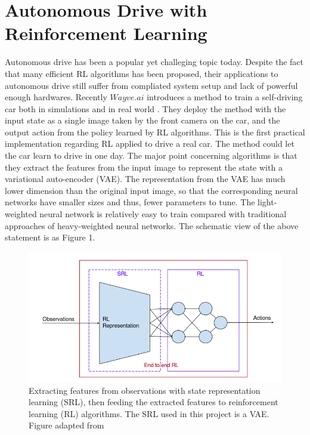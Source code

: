 \documentclass{article} %
\begin{document}
\section{Autonomous Drive with Reinforcement Learning}
Autonomous drive has been a popular yet challeging topic today. Despite the fact that many efficient RL algorithms has been proposed, their applications to autonomous drive still suffer from compliated system setup and lack of powerful enough hardwares. Recently $Wayve.ai$ introduces a method to train a self-driving car both in simulations and in real world \cite{kendall2018learning}. They deploy the method with the input state as a single image taken by the front camera on the car, and the output action from the policy learned by RL algorithms. This is the first practical implementation regarding RL applied to drive a real car. The method could let the car learn to drive in one day. The major point concerning algorithms is that they extract the features from the input image to represent the state with a variational auto-encoder (VAE). The representation from the VAE has much lower dimension than the original input image, so that the corresponding neural networks have smaller sizes and thus, fewer parameters to tune. The light-weighted neural network is relatively easy to train compared with traditional approaches of heavy-weighted neural networks. The schematic view of the above statement is as Figure 1.

\begin{figure}[!htb]
  \centering
  \includegraphics[width=0.7\linewidth]{fig1_srl.png}
  \caption{Extracting features from observations with state representation learning (SRL), then feeding the extracted features to reinforcement learning (RL) algorithms. The SRL used in this project is a VAE. Figure adapted from \cite{drive-smoothly-in-minutes}}
\end{figure}
\end{document}
